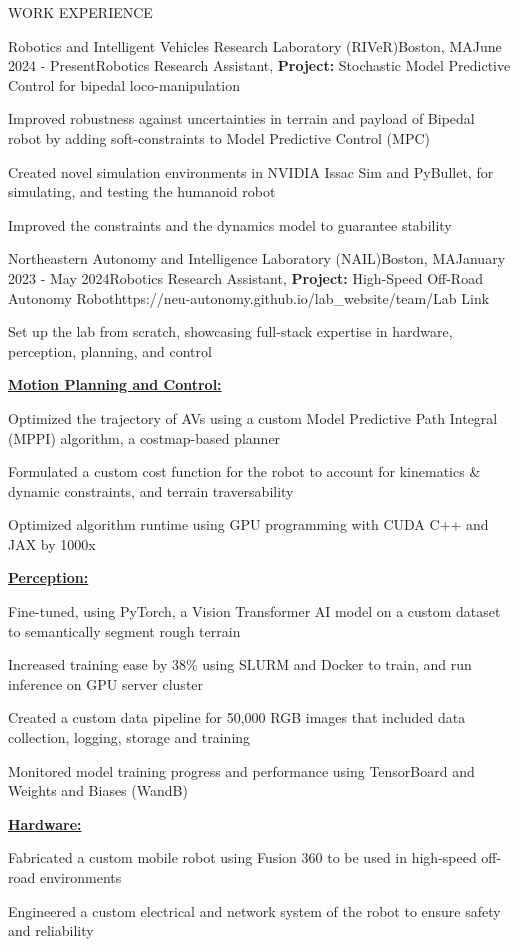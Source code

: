 \documentclass{resume} %
\begin{document}
\begin{rSection}{WORK EXPERIENCE}
	\begin{rProjExpDetails}{Robotics and Intelligent Vehicles Research Laboratory (RIVeR)}{Boston, MA}{June 2024 - Present}{Robotics Research Assistant, \textbf{Project:} Stochastic Model Predictive Control for bipedal loco-manipulation}{}{}
		\item Improved robustness against uncertainties in terrain and payload of Bipedal robot by adding soft-constraints to Model Predictive Control (MPC)
		\item Created novel simulation environments in NVIDIA Issac Sim and PyBullet, for simulating, and testing the humanoid robot
		\item Improved the constraints and the dynamics model to guarantee stability
	\end{rProjExpDetails}
	\begin{rProjExpDetails}{Northeastern Autonomy and Intelligence Laboratory (NAIL)}{Boston, MA}{January 2023 - May 2024}{Robotics Research Assistant, \textbf{Project:} High-Speed Off-Road Autonomy Robot}{https://neu-autonomy.github.io/lab_website/team/}{Lab Link}
		\item Set up the lab from scratch, showcasing full-stack expertise in hardware, perception, planning, and control
		\item[] \underline{\textbf{Motion Planning and Control:}}
		\item Optimized the trajectory of AVs using a custom Model Predictive Path Integral (MPPI) algorithm, a costmap-based planner
		\item Formulated a custom cost function for the robot to account for kinematics \& dynamic constraints, and terrain traversability
		\item Optimized algorithm runtime using GPU programming with CUDA C++ and JAX by 1000x
		\item[] \underline{\textbf{Perception:}}
		\item Fine-tuned, using PyTorch, a Vision Transformer AI model on a custom dataset to semantically segment rough terrain
		\item Increased training ease by 38\% using SLURM and Docker to train, and run inference on GPU server cluster
		\item Created a custom data pipeline for 50,000 RGB images that included data collection, logging, storage and training
		\item Monitored model training progress and performance using TensorBoard and Weights and Biases (WandB)
		\item[] \underline{\textbf{Hardware:}}
		\item Fabricated a custom mobile robot using Fusion 360 to be used in high-speed off-road environments
		\item Engineered a custom electrical and network system of the robot to ensure safety and reliability
	\end{rProjExpDetails}


\end{rSection}
\end{document}

